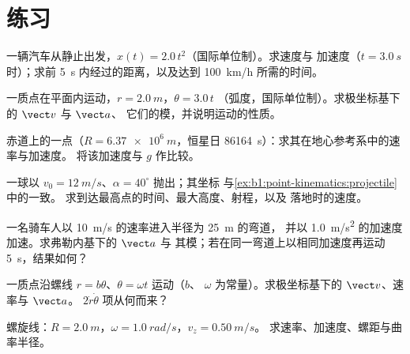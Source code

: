\section{练习}

\begin{exercise}[$\star$]\label{exo:b1:point-kinematics:1}
一辆汽车从静止出发，$x(t) = 2.0\,t^2$（国际单位制）。求速度与
加速度（$t = \qty{3.0}{s}$ 时）；求前
\qty{5}{s} 内经过的距离，以及达到 \qty{100}{km/h} 所需的时间。
\end{exercise}

\begin{exercise}[$\star$]\label{exo:b1:point-kinematics:2}
一质点在平面内运动，$r = \qty{2.0}{m}$，$\theta = 3.0\,t$
（弧度，国际单位制）。求极坐标基下的 $\vect v$ 与 $\vect a$、
它们的模，并说明运动的性质。
\end{exercise}

\begin{exercise}[$\star$]\label{exo:b1:point-kinematics:3}
赤道上的一点（$R = \qty{6.37e6}{m}$，恒星日
\qty{86164}{s}）：求其在地心参考系中的速率与加速度。
将该加速度与 $g$ 作比较。
\end{exercise}

\begin{exercise}[$\star$]\label{exo:b1:point-kinematics:4}
一球以 $v_0 = \qty{12}{m/s}$、$\alpha = 40^\circ$ 抛出；其坐标
与\cref{ex:b1:point-kinematics:projectile}中的一致。
求到达最高点的时间、最大高度、射程，以及
落地时的速度。
\end{exercise}

\begin{exercise}[$\star\star$]\label{exo:b1:point-kinematics:5}
一名骑车人以 \qty{10}{m/s} 的速率进入半径为 \qty{25}{m} 的弯道，
并以 \qty{1.0}{m/s^2} 的加速度加速。求弗勒内基下的 $\vect a$ 与
其模；若在同一弯道上以相同加速度再运动 \qty{5}{s}，结果如何？
\end{exercise}

\begin{exercise}[$\star\star$]\label{exo:b1:point-kinematics:6}
一质点沿螺线 $r = b\theta$、$\theta = \omega t$ 运动（$b$、
$\omega$ 为常量）。求极坐标基下的 $\vect v$、速率与 $\vect a$。
$2\dot r\dot\theta$ 项从何而来？
\end{exercise}

\begin{exercise}[$\star\star$]\label{exo:b1:point-kinematics:7}
螺旋线：$R = \qty{2.0}{m}$，$\omega = \qty{1.0}{rad/s}$，$v_z = \qty{0.50}{m/s}$。
求速率、加速度、螺距与曲率半径。
\end{exercise}

